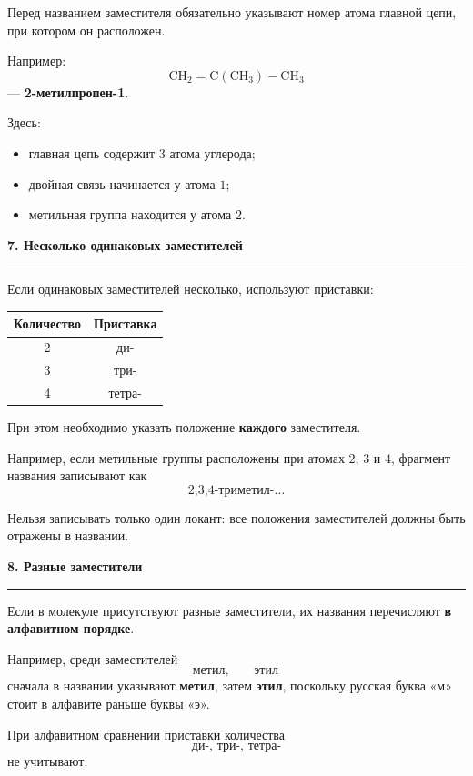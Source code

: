 \documentclass[a4paper,12pt]{article}
\newcommand{\lessonsection}[1]{%
    \vspace{0.7em}
    {\Large\bfseries\color{darkaccent}#1}\par
    \vspace{0.15em}
    {\color{linegray}\rule{\linewidth}{0.7pt}}
    \vspace{0.35em}
}
\newcommand{\important}[1]{\textbf{\color{darkaccent}#1}}
\begin{document}
Перед названием заместителя обязательно указывают номер атома главной цепи, при котором он расположен.

Например:
\[
\mathrm{CH_2=C(CH_3)-CH_3}
\]
--- \important{2-метилпропен-1}.

Здесь:
\begin{itemize}
    \item главная цепь содержит \(3\) атома углерода;
    \item двойная связь начинается у атома \(1\);
    \item метильная группа находится у атома \(2\).
\end{itemize}


\lessonsection{7. Несколько одинаковых заместителей}

Если одинаковых заместителей несколько, используют приставки:

\begin{center}
\renewcommand{\arraystretch}{1.25}
\begin{tabular}{cc}
\toprule
Количество & Приставка \\
\midrule
2 & ди- \\
3 & три- \\
4 & тетра- \\
\bottomrule
\end{tabular}
\end{center}

При этом необходимо указать положение \important{каждого} заместителя.

Например, если метильные группы расположены при атомах \(2\), \(3\) и \(4\), фрагмент названия записывают как
\[
\boxed{\text{2,3,4-триметил-}\ldots}
\]

Нельзя записывать только один локант: все положения заместителей должны быть отражены в названии.


\lessonsection{8. Разные заместители}

Если в молекуле присутствуют разные заместители, их названия перечисляют
\important{в алфавитном порядке}.

Например, среди заместителей
\[
\text{метил},\qquad \text{этил}
\]
сначала в названии указывают \important{метил}, затем \important{этил}, поскольку русская буква «м» стоит в алфавите раньше буквы «э».

При алфавитном сравнении приставки количества
\[
\text{ди-, три-, тетра-}
\]
не учитывают.
\end{document}

